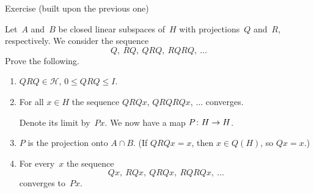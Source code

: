 \documentclass[main.tex]{subfiles}
\begin{document}
%
%
\begin{psec}{5.24}{Exercise}
(built upon the previous one)
\begin{center}
\end{center}
Let~$A$ and~$B$ be closed linear subspaces of~$H$
with projections~$Q$ and~$R$, respectively.
We consider the sequence
\begin{equation*}
Q,\ RQ,\ QRQ,\ RQRQ,\ \dotsc
\end{equation*}
Prove the following.
\begin{enumerate}
\item\label{5.24-1}
$QRQ\in\mathscr H$, $0\leq QRQ \leq I$.
%
\item\label{5.24-2}
For all $x\in H$ the sequence $QRQx$,  $QRQRQx$, 
$\dotsc$ converges.

Denote its limit by~$Px$.
We now have a map $P\colon H\rightarrow H$.
%
\item\label{5.24-3}
$P$ is the projection onto $A\cap B$.
(If $QRQx=x$, then $x\in Q(H)$, so $Qx=x$.)
%
\item\label{5.24-4}
For every~$x$ the sequence
\begin{equation*}
Qx,\ RQx,\ QRQx,\ RQRQx,\ \dotsc
\end{equation*}
converges to~$Px$.
\end{enumerate}
\end{psec}
\end{document}
